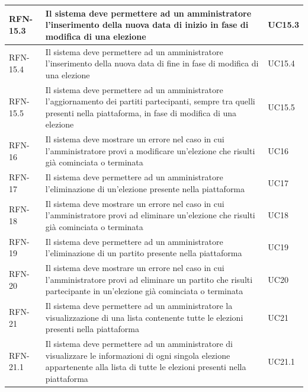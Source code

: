 \begin{longtable}{| p{} | p{} | p{} |}
RFN-15.3     & Il sistema deve permettere ad un amministratore l'inserimento della nuova data di inizio in fase di modifica di una elezione  & UC15.3 \\

\hline

RFN-15.4     & Il sistema deve permettere ad un amministratore l'inserimento della nuova data di fine in fase di modifica di una elezione  & UC15.4 \\

\hline

RFN-15.5     & Il sistema deve permettere ad un amministratore l'aggiornamento dei partiti partecipanti, sempre tra quelli presenti nella piattaforma, in fase di modifica di una elezione  & UC15.5 \\

\hline

RFN-16     & Il sistema deve mostrare un errore nel caso in cui l'amministratore provi a modificare un'elezione che risulti già cominciata o terminata  & UC16 \\

\hline

RFN-17     & Il sistema deve permettere ad un amministratore l'eliminazione di un'elezione presente nella piattaforma  & UC17 \\

\hline

RFN-18     & Il sistema deve mostrare un errore nel caso in cui l'amministratore provi ad eliminare un'elezione che risulti già cominciata o terminata  & UC18 \\

\hline

RFN-19     & Il sistema deve permettere ad un amministratore l'eliminazione di un partito presente nella piattaforma  & UC19 \\

\hline

RFN-20     & Il sistema deve mostrare un errore nel caso in cui l'amministratore provi ad eliminare un partito che risulti partecipante in un'elezione già cominciata o terminata  & UC20 \\

\hline

RFN-21     & Il sistema deve permettere ad un amministratore la visualizzazione di una lista contenente tutte le elezioni presenti nella piattaforma & UC21 \\

\hline

RFN-21.1     & Il sistema deve permettere ad un amministratore di visualizzare le informazioni di ogni singola elezione appartenente alla lista di tutte le elezioni presenti nella piattaforma & UC21.1 \\


\end{longtable}
